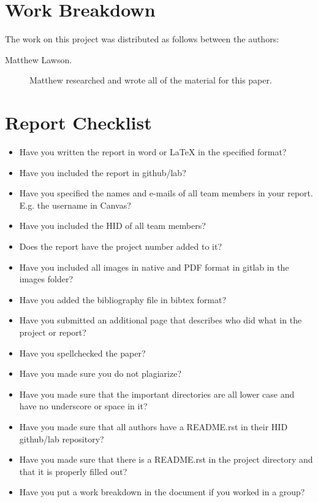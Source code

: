 \documentclass[9pt,twocolumn,twoside]{styles/osajnl}
\begin{document}
\newpage

\appendix

\section{Work Breakdown}

The work on this project was distributed as follows between the
authors:

\begin{description}

\item[Matthew Lawson.] Matthew researched and wrote all of the material for this paper.

\end{description}

\section{Report Checklist}

\begin{itemize}
\renewcommand{\labelitemi}{\scriptsize$\square$} 
\item Have you written the report in word or LaTeX in the specified
  format?
\item Have you included the report in github/lab?
\item Have you specified the names and e-mails of all team members in
  your report. E.g. the username in Canvas?
\item Have you included the HID of all team members?
\item Does the report have the project number added to it?
\item Have you included all images in native and PDF format in gitlab
  in the images folder?
\item Have you added the bibliography file in bibtex format?
\item Have you submitted an additional page that describes who did
  what in the project or report?
\item Have you spellchecked the paper?
\item Have you made sure you do not plagiarize?
\item Have you made sure that the important directories are all lower
  case and have no underscore or space in it?
\item Have you made sure that all authors have a README.rst in their
  HID github/lab repository?
\item Have you made sure that there is a README.rst in the project
  directory and that it is properly filled out?
\item Have you put a work breakdown in the document if you worked in a
  group?
\end{itemize}
\end{document}
